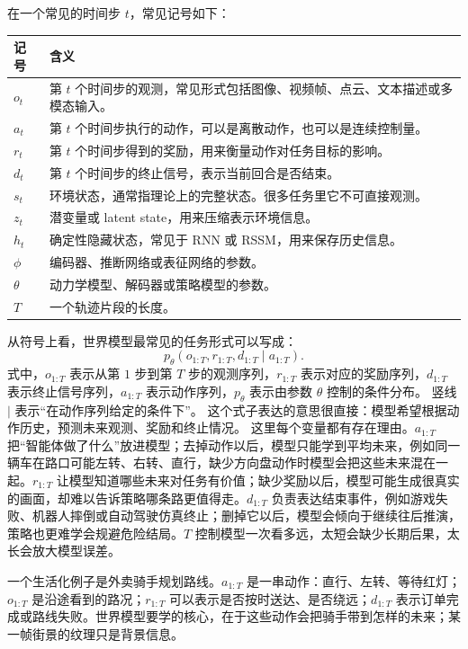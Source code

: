 \documentclass[11pt,a4paper]{ctexart}
\begin{document}
在一个常见的时间步 $t$，常见记号如下：

\begin{longtable}{p{} p{}}
\toprule
记号 & 含义 \\
\midrule
$o_t$ & 第 $t$ 个时间步的观测，常见形式包括图像、视频帧、点云、文本描述或多模态输入。 \\
$a_t$ & 第 $t$ 个时间步执行的动作，可以是离散动作，也可以是连续控制量。 \\
$r_t$ & 第 $t$ 个时间步得到的奖励，用来衡量动作对任务目标的影响。 \\
$d_t$ & 第 $t$ 个时间步的终止信号，表示当前回合是否结束。 \\
$s_t$ & 环境状态，通常指理论上的完整状态。很多任务里它不可直接观测。 \\
$z_t$ & 潜变量或 latent state，用来压缩表示环境信息。 \\
$h_t$ & 确定性隐藏状态，常见于 RNN 或 RSSM，用来保存历史信息。 \\
$\phi$ & 编码器、推断网络或表征网络的参数。 \\
$\theta$ & 动力学模型、解码器或策略模型的参数。 \\
$T$ & 一个轨迹片段的长度。 \\
\bottomrule
\end{longtable}

从符号上看，世界模型最常见的任务形式可以写成：
\begin{equation}
  p_\theta(o_{1:T}, r_{1:T}, d_{1:T}\mid a_{1:T}).
\end{equation}
式中，$o_{1:T}$ 表示从第 $1$ 步到第 $T$ 步的观测序列，$r_{1:T}$ 表示对应的奖励序列，$d_{1:T}$ 表示终止信号序列，$a_{1:T}$ 表示动作序列，$p_\theta$ 表示由参数 $\theta$ 控制的条件分布。
竖线 $\mid$ 表示“在动作序列给定的条件下”。
这个式子表达的意思很直接：模型希望根据动作历史，预测未来观测、奖励和终止情况。
这里每个变量都有存在理由。$a_{1:T}$ 把“智能体做了什么”放进模型；去掉动作以后，模型只能学到平均未来，例如同一辆车在路口可能左转、右转、直行，缺少方向盘动作时模型会把这些未来混在一起。$r_{1:T}$ 让模型知道哪些未来对任务有价值；缺少奖励以后，模型可能生成很真实的画面，却难以告诉策略哪条路更值得走。$d_{1:T}$ 负责表达结束事件，例如游戏失败、机器人摔倒或自动驾驶仿真终止；删掉它以后，模型会倾向于继续往后推演，策略也更难学会规避危险结局。$T$ 控制模型一次看多远，太短会缺少长期后果，太长会放大模型误差。

一个生活化例子是外卖骑手规划路线。$a_{1:T}$ 是一串动作：直行、左转、等待红灯；$o_{1:T}$ 是沿途看到的路况；$r_{1:T}$ 可以表示是否按时送达、是否绕远；$d_{1:T}$ 表示订单完成或路线失败。世界模型要学的核心，在于这些动作会把骑手带到怎样的未来；某一帧街景的纹理只是背景信息。
\end{document}
